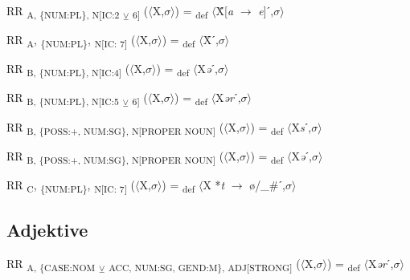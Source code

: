 {\begin{exe}
 RR \textsubscript{A, \{NUM:PL\}, N[IC:2} \textsubscript{${\veebar}$}\textsubscript{ 6]} ($\langle$X,$\sigma $$\rangle$) = \textsubscript{def} $\langle$Ẍ[\textit{a} $\rightarrow$ \textit{e}]ˊ,$\sigma $$\rangle$
\end{exe}

\begin{exe}
 RR \textsubscript{A}, \textsubscript{\{NUM:PL\}}, \textsubscript{N[IC: 7]} ($\langle$X,$\sigma $$\rangle$) = \textsubscript{def} $\langle$X̑ˊ,$\sigma $$\rangle$
\end{exe}

\begin{exe}
 RR \textsubscript{B, \{NUM:PL\}, N[IC:4]} ($\langle$X,$\sigma $$\rangle$) = \textsubscript{def} $\langle$X\textit{ə}ˊ,$\sigma $$\rangle$
\end{exe}

\begin{exe}
 RR \textsubscript{B, \{NUM:PL\}, N[IC:5} \textsubscript{${\veebar}$}\textsubscript{ 6]} ($\langle$X,$\sigma $$\rangle$) = \textsubscript{def} $\langle$X\textit{ər}ˊ,$\sigma $$\rangle$
\end{exe}

\begin{exe}
 RR \textsubscript{B, \{POSS:+, NUM:SG\}, N[}\textsubscript{PROPER NOUN]} ($\langle$X,$\sigma $$\rangle$) = \textsubscript{def} $\langle$X\textit{s}ˊ,$\sigma $$\rangle$
\end{exe}

\begin{exe}
 RR \textsubscript{B, \{POSS:+, NUM:SG\}, N[}\textsubscript{PROPER NOUN]} ($\langle$X,$\sigma $$\rangle$) = \textsubscript{def} $\langle$X\textit{ə}ˊ,$\sigma $$\rangle$
\end{exe}

\begin{exe}
 RR \textsubscript{C}, \textsubscript{\{NUM:PL\}}, \textsubscript{N[IC: 7]} ($\langle$X,$\sigma $$\rangle$) = \textsubscript{def} $\langle$X *\textit{t} $\rightarrow$ ø/\_\#ˊ,$\sigma $$\rangle$
\end{exe}

\subsection{Adjektive}

\begin{exe}
 RR \textsubscript{A, \{CASE:NOM} \textsubscript{${\veebar}$}\textsubscript{ ACC, NUM:SG, GEND:M\}, ADJ[STRONG]} ($\langle$X,$\sigma $$\rangle$) = \textsubscript{def} $\langle$X\textit{ər}ˊ,$\sigma $$\rangle$
\end{exe}

}
